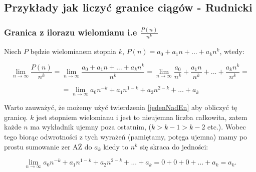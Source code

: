 \documentclass[a4paper,oneside,openright,11pt]{article}
\numberwithin{equation}{section}
\begin{document}
\subsection{Przykłady jak liczyć granice ciągów - Rudnicki}

\subsubsection{Granica z ilorazu wielomianu i.e $\frac{P(n)}{n^k}$}


Niech $P$ będzie wielomianem stopnia $k$, $P(n) = a_{0} + a_{1}n + \mbox{...} + a_{k}n^{k}$, wtedy:

\begin{equation*}
    \lim_{n\to\infty} \frac{P(n)}{n^k} = \lim_{n\to\infty} \frac{a_{0} + a_{1}n + \mbox{...} + a_{k}n^{k}}{n^k} = \lim_{n\to\infty} \frac{a_{0}}{n^k} + \frac{a_{1}n}{n^k} + \mbox{...} + \frac{a_{k}n^{k}}{n^k} =
\end{equation*}

\begin{equation*}
    = \lim_{n\to\infty} a_{0}n^{-k} + a_{1}n^{1-k} + a_{2}n^{2-k} + \mbox{...} + a_{k} 
\end{equation*}

Warto zauważyć, że możemy użyć twierdzenia \ref{jedenNadEn} aby obliczyć tę granicę. $k$ jest stopniem wielomianu i jest to nieujemna liczba całkowita, zatem każde $n$ ma wykładnik ujemny poza ostatnim, ($k > k - 1 > k - 2$ etc.).
Wobec tego biorąc odwrotności z tych wyrażeń (pamiętamy, potęga ujemna) mamy po prostu sumowanie zer AŻ do $a_k$ kiedy to $n^k$ się skraca do jedności:

\begin{equation*}
    \lim_{n\to\infty} a_{0}n^{-k} + a_{1}n^{1-k} + a_{2}n^{2-k} + \mbox{...} + a_{k} = 0 + 0 + 0 + \mbox{...} + a_k = a_k.
\end{equation*}
\end{document}
